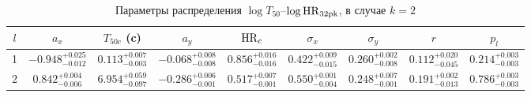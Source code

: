 \begin{table} [h]
 \centering
 \caption{Параметры распределения $\log T_{50}$--$\log {\mathrm{HR}}_{32{\mathrm{pk}}}$, в случае $k=2$}\label{tab:pk_clust_2}
\scriptsize

  \begin{center}
  \begin{tabular}{c c c c c c c c c}
  \hline
  \hline
  $l$  &  $a_x$ &  $T_{50c}$ (c) &  $a_y$ &   ${\mathrm{HR}}_c$ &  $\sigma_x$ &  $\sigma_y$ &  $r$ &  $p_l$\\
  \hline
1 & $-0.948_{-  0.012}^{+  0.025}$ & $   0.113_{-  0.003}^{+  0.007}$ & $-0.068_{-  0.008}^{+  0.008}$ & $   0.856_{-  0.016}^{+  0.016}$ & $ 0.422_{-  0.015}^{+  0.009}$ & $ 0.260_{-  0.008}^{+  0.002}$ & $ 0.112_{-  0.045}^{+  0.020}$ & $ 0.214_{-  0.003}^{+  0.003}$\\
2 & $ 0.842_{-  0.006}^{+  0.004}$ & $   6.954_{-  0.097}^{+  0.059}$ & $-0.286_{-  0.001}^{+  0.006}$ & $   0.517_{-  0.001}^{+  0.007}$ & $ 0.550_{-  0.004}^{+  0.001}$ & $ 0.248_{-  0.001}^{+  0.007}$ & $ 0.191_{-  0.013}^{+  0.002}$ & $ 0.786_{-  0.003}^{+  0.003}$\\
\hline
\end{tabular}
\end{center}
\end{table}
%